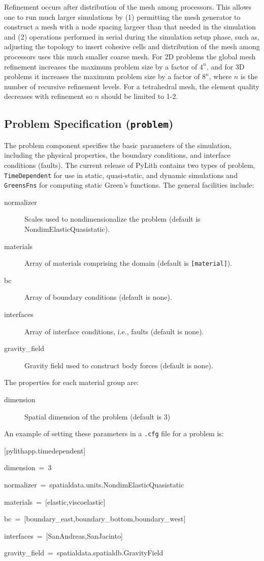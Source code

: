 Refinement occurs after distribution of the mesh among processors.
This allows one to run much larger simulations by (1) permitting the
mesh generator to construct a mesh with a node spacing largeer than
that needed in the simulation and (2) operations performed in serial
during the simulation setup phase, such as, adjusting the topology
to insert cohesive cells and distribution of the mesh among processors
uses this much smaller coarse mesh. For 2D problems the global mesh
refinement increases the maximum problem size by a factor of $4^{n}$,
and for 3D problems it increases the maximum problem size by a factor
of $8^{n}$, where $n$ is the number of recursive refinement levels.
For a tetrahedral mesh, the element quality decreases with refinement
so $n$ should be limited to 1-2.


\subsection{Problem Specification (\texttt{problem})}

The problem component specifies the basic parameters of the simulation,
including the physical properties, the boundary conditions, and interface
conditions (faults). The current release of PyLith contains two types
of problem, \texttt{TimeDependent} for use in static, quasi-static,
and dynamic simulations and \texttt{GreensFns} for computing static
Green's functions. The general facilities include:
\begin{description}
\item [{normalizer}] Scales used to nondimensionalize the problem (default
is NondimElasticQuasistatic).
\item [{materials}] Array of materials comprising the domain (default is
\texttt{{[}material{]}}).
\item [{bc}] Array of boundary conditions (default is none).
\item [{interfaces}] Array of interface conditions, i.e., faults (default
is none).
\item [{gravity\_field}] Gravity field used to construct body forces (default
is none).
\end{description}
The properties for each material group are:
\begin{description}
\item [{dimension}] Spatial dimension of the problem (default is 3)
\end{description}
An example of setting these parameters in a \texttt{.cfg} file for
a problem is:
\begin{lyxcode}
{[}pylithapp.timedependent{]}

dimension~=~3

normalizer~=~spatialdata.units.NondimElasticQuasistatic

materials~=~{[}elastic,viscoelastic{]}

bc~=~{[}boundary\_east,boundary\_bottom,boundary\_west{]}

interfaces~=~{[}SanAndreas,SanJacinto{]}

gravity\_field~=~spatialdata.spatialdb.GravityField
\end{lyxcode}

